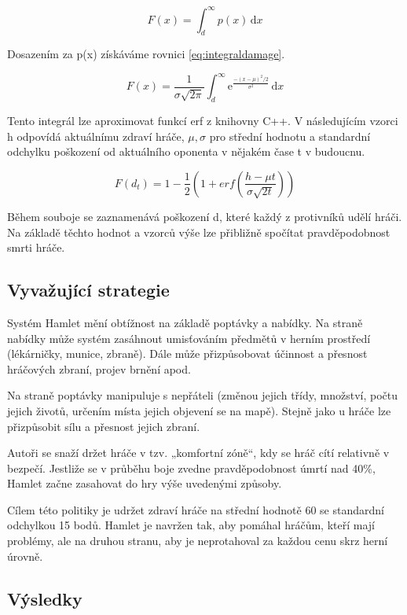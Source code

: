 \begin{equation}
	   F(x) = \int_d^\infty p(x)\,\mathrm{d}x
\end{equation}

Dosazením za p(x) získáváme rovnici \ref{eq:integraldamage}.

\begin{equation} \label{eq:integraldamage}
	   F(x) = \frac{1}{\sigma\sqrt{2\pi}}\int_d^\infty \mathrm{e}^{\frac{-(x-\mu)^2/2}{\sigma^2}}\,\mathrm{d}x
\end{equation}

Tento integrál lze aproximovat funkcí erf z knihovny C++. V následujícím vzorci h odpovídá aktuálnímu zdraví hráče, $\mu, \sigma$ pro střední hodnotu a standardní odchylku poškození od aktuálního oponenta v nějakém čase t v budoucnu.

\begin{equation}
	   F(d_t) = 1-\frac{1}{2}(1+erf(\frac{h-\mu t}{\sigma\sqrt{2t}}))
\end{equation}

Během souboje se zaznamenává poškození d, které každý z protivníků udělí hráči. Na základě těchto hodnot a vzorců výše lze přibližně spočítat pravděpodobnost smrti hráče.

\subsection{Vyvažující strategie}

Systém Hamlet mění obtížnost na základě poptávky a nabídky. Na straně nabídky může systém zasáhnout umisťováním předmětů v herním prostředí (lékárničky, munice, zbraně). Dále může přizpůsobovat účinnost a přesnost hráčových zbraní, projev brnění apod.

Na straně poptávky manipuluje s nepřáteli (změnou jejich třídy, množství, počtu jejich životů, určením místa jejich objevení se na mapě). Stejně jako u hráče lze přizpůsobit sílu a přesnost jejich zbraní.

Autoři se snaží držet hráče v tzv. „komfortní zóně“, kdy se hráč cítí relativně v bezpečí. Jestliže se v průběhu boje zvedne pravděpodobnost úmrtí nad 40\%, Hamlet začne zasahovat do hry výše uvedenými způsoby.

Cílem této politiky je udržet zdraví hráče na střední hodnotě 60 se standardní odchylkou 15 bodů. Hamlet je navržen tak, aby pomáhal hráčům, kteří mají problémy, ale na druhou stranu, aby je neprotahoval za každou cenu skrz herní úrovně.

\subsection{Výsledky}

